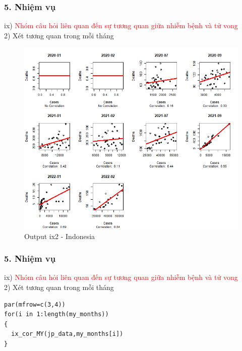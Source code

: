 \documentclass[english,10pt,table]{beamer}
\begin{document}
\begin{frame}[fragile]
\frametitle{5.  Nhiệm vụ}
ix) \textcolor{red}{Nhóm câu hỏi liên quan đến sự tương quan giữa nhiễm bệnh và tử vong}\\
    2) Xét tương quan trong mỗi tháng
	\begin{figure}[h!]
	\begin{center}
		    \includegraphics[scale = 0.36]{Images/IX/Indo.png}
		     \caption{Output ix2 - Indonesia}
		\end{center}
		\end{figure}
\end{frame}

\begin{frame}[fragile]
\frametitle{5.  Nhiệm vụ}
ix) \textcolor{red}{Nhóm câu hỏi liên quan đến sự tương quan giữa nhiễm bệnh và tử vong}\\
          2) Xét tương quan trong mỗi tháng
\lstset{
    title=Source code for Japan}
\begin{lstlisting}[frame=single]  
par(mfrow=c(3,4))
for(i in 1:length(my_months))
{
  ix_cor_MY(jp_data,my_months[i])
}
\end{lstlisting}
\end{frame}
\end{document}
